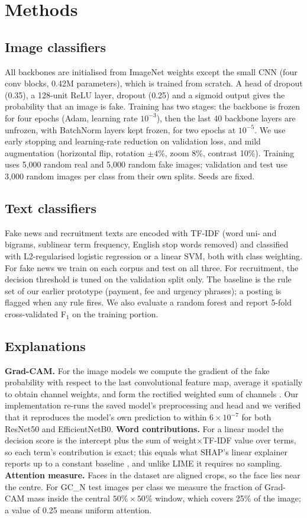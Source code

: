 \documentclass[runningheads]{llncs}
\newcommand{\gcN}{GC_N}
\begin{document}
\section{Methods}
\subsection{Image classifiers}
All backbones are initialised from ImageNet weights \cite{resnet,effnet,mobilenet} except the small CNN (four conv blocks, 0.42M parameters), which is trained from scratch. A head of dropout (0.35), a 128-unit ReLU layer, dropout (0.25) and a sigmoid output gives the probability that an image is fake. Training has two stages: the backbone is frozen for four epochs (Adam, learning rate $10^{-3}$), then the last 40 backbone layers are unfrozen, with BatchNorm layers kept frozen, for two epochs at $10^{-5}$. We use early stopping and learning-rate reduction on validation loss, and mild augmentation (horizontal flip, rotation $\pm4\%$, zoom 8\%, contrast 10\%). Training uses 5,000 random real and 5,000 random fake images; validation and test use 3,000 random images per class from their own splits. Seeds are fixed.

\subsection{Text classifiers}
Fake news and recruitment texts are encoded with TF-IDF (word uni- and bigrams, sublinear term frequency, English stop words removed) and classified with L2-regularised logistic regression or a linear SVM, both with class weighting. For fake news we train on each corpus and test on all three. For recruitment, the decision threshold is tuned on the validation split only. The baseline is the rule set of our earlier prototype (payment, fee and urgency phrases); a posting is flagged when any rule fires. We also evaluate a random forest and report 5-fold cross-validated F$_1$ on the training portion.

\subsection{Explanations}
\textbf{Grad-CAM.} For the image models we compute the gradient of the fake probability with respect to the last convolutional feature map, average it spatially to obtain channel weights, and form the rectified weighted sum of channels \cite{gradcam}. Our implementation re-runs the saved model's preprocessing and head and we verified that it reproduces the model's own prediction to within $6\times10^{-7}$ for both ResNet50 and EfficientNetB0. \textbf{Word contributions.} For a linear model the decision score is the intercept plus the sum of weight$\times$TF-IDF value over terms, so each term's contribution is exact; this equals what SHAP's linear explainer reports up to a constant baseline \cite{shap}, and unlike LIME \cite{lime} it requires no sampling. \textbf{Attention measure.} Faces in the dataset are aligned crops, so the face lies near the centre. For \gcN{} test images per class we measure the fraction of Grad-CAM mass inside the central $50\%\times50\%$ window, which covers 25\% of the image; a value of 0.25 means uniform attention.
\end{document}

